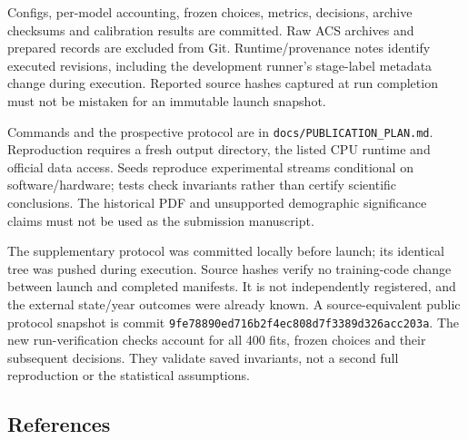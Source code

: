 \documentclass[
  10pt,
]{article}
\begin{document}
Configs, per-model accounting, frozen choices, metrics, decisions,
archive checksums and calibration results are committed. Raw ACS
archives and prepared records are excluded from Git. Runtime/provenance
notes identify executed revisions, including the development runner's
stage-label metadata change during execution. Reported source hashes
captured at run completion must not be mistaken for an immutable launch
snapshot.

Commands and the prospective protocol are in
\texttt{docs/PUBLICATION\_PLAN.md}. Reproduction requires a fresh output
directory, the listed CPU runtime and official data access. Seeds
reproduce experimental streams conditional on software/hardware; tests
check invariants rather than certify scientific conclusions. The
historical PDF and unsupported demographic significance claims must not
be used as the submission manuscript.

The supplementary protocol was committed locally before launch; its
identical tree was pushed during execution. Source hashes verify no
training-code change between launch and completed manifests. It is not
independently registered, and the external state/year outcomes were
already known. A source-equivalent public protocol snapshot is commit
\texttt{9fe78890ed716b2f4ec808d7f3389d326acc203a}. The new
run-verification checks account for all 400 fits, frozen choices and
their subsequent decisions. They validate saved invariants, not a second
full reproduction or the statistical assumptions.

\hypertarget{references}{%
\subsection{References}\label{references}}
\end{document}
